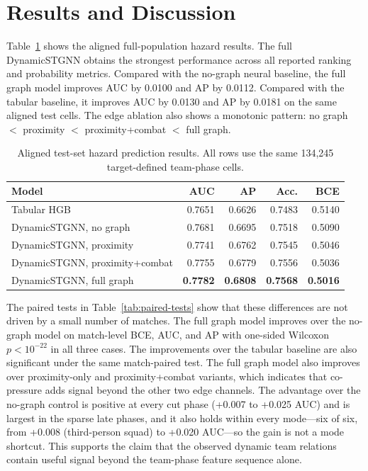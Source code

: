 \section{Results and Discussion}
\label{sec:results}

Table~\ref{tab:main-hazard-results} shows the aligned full-population hazard
results. The full DynamicSTGNN obtains the strongest performance across all
reported ranking and probability metrics. Compared with the no-graph neural
baseline, the full graph model improves AUC by 0.0100 and AP by 0.0112. Compared
with the tabular baseline, it improves AUC by 0.0130 and AP by 0.0181 on the
same aligned test cells. The edge ablation also shows a monotonic pattern:
no graph \(<\) proximity \(<\) proximity+combat \(<\) full graph.

\begin{table}[t]
\centering
\caption{Aligned test-set hazard prediction results. All rows use the same
134,245 target-defined team-phase cells.}
\label{tab:main-hazard-results}
\small
\begin{tabular}{lrrrr}
\toprule
Model & AUC & AP & Acc. & BCE \\
\midrule
Tabular HGB & 0.7651 & 0.6626 & 0.7483 & 0.5140 \\
DynamicSTGNN, no graph & 0.7681 & 0.6695 & 0.7518 & 0.5090 \\
DynamicSTGNN, proximity & 0.7741 & 0.6762 & 0.7545 & 0.5046 \\
DynamicSTGNN, proximity+combat & 0.7755 & 0.6779 & 0.7556 & 0.5036 \\
DynamicSTGNN, full graph & \textbf{0.7782} & \textbf{0.6808} & \textbf{0.7568} & \textbf{0.5016} \\
\bottomrule
\end{tabular}
\end{table}

The paired tests in Table~\ref{tab:paired-tests} show that these differences
are not driven by a small number of matches. The full graph model improves over
the no-graph model on match-level BCE, AUC, and AP with one-sided Wilcoxon
\(p < 10^{-22}\) in all three cases. The improvements over the tabular baseline
are also significant under the same match-paired test. The full graph model
also improves over proximity-only and proximity+combat variants, which indicates
that co-pressure adds signal beyond the other two edge channels. The advantage
over the no-graph control is positive at every cut phase (+0.007 to +0.025
AUC) and is largest in the sparse late phases, and it also holds within every
mode---six of six, from +0.008 (third-person squad) to +0.020 AUC---so the
gain is not a mode shortcut. This supports
the claim that the observed dynamic team relations contain useful signal beyond
the team-phase feature sequence alone.

